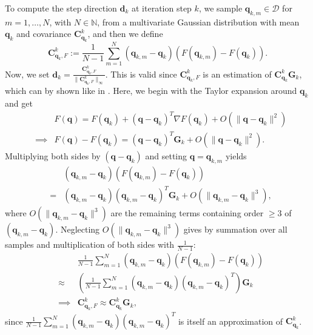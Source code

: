 To compute the step direction $\mathbf{d}_k$ at iteration step $k$, we sample $\mathbf{q}_{k,m}\in\mathcal{D}$ for $m=1,\dotsc,N$, with $N\in\mathbb{N}$, from a multivariate Gaussian distribution with mean $\mathbf{q}_k$ and covariance $\mathbf{C}_{\mathbf{q}_k}^k$, and then we define
\begin{equation}
\label{CqkF}
\mathbf{C}_{\mathbf{q}_k,F}^k:=\frac{1}{N-1}\sum_{m=1}^N(\mathbf{q}_{k,m}-\mathbf{q}_k)(F(\mathbf{q}_{k,m})-F(\mathbf{q}_k)).
\end{equation}
Now, we set $\mathbf{d}_k=\frac{\mathbf{C}_{\mathbf{q}_k,F}^k}{\|\mathbf{C}_{\mathbf{q}_k,F}^k\|_\infty}$. This is valid since $\mathbf{C}_{\mathbf{q}_k,F}^k$ is an estimation of $\mathbf{C}_{\mathbf{q}_k}^k\mathbf{G}_k$, which can by shown like in \cite{OGUNTOLA2021109165}. Here, we begin with the Taylor expansion around $\mathbf{q}_k$ and get
\begin{eqnarray*}
&&F(\mathbf{q})=F(\mathbf{q}_k)+(\mathbf{q}-\mathbf{q}_k)^T\nabla F(\mathbf{q}_k)+O(\|\mathbf{q}-\mathbf{q}_k\|^2)\\
&\implies&F(\mathbf{q})-F(\mathbf{q}_k)=(\mathbf{q}-\mathbf{q}_k)^T\mathbf{G}_k+O(\|\mathbf{q}-\mathbf{q}_k\|^2).
\end{eqnarray*}
Multiplying both sides by $(\mathbf{q}-\mathbf{q}_k)$ and setting $\mathbf{q}=\mathbf{q}_{k,m}$ yields
\begin{eqnarray*}
&&(\mathbf{q}_{k,m}-\mathbf{q}_k)(F(\mathbf{q}_{k,m})-F(\mathbf{q}_k))\\
&=&(\mathbf{q}_{k,m}-\mathbf{q}_k)(\mathbf{q}_{k,m}-\mathbf{q}_k)^T\mathbf{G}_k+O(\|\mathbf{q}_{k,m}-\mathbf{q}_k\|^3),
\end{eqnarray*}
where $O(\|\mathbf{q}_{k,m}-\mathbf{q}_k\|^3)$ are the remaining terms containing order $\geq3$ of $(\mathbf{q}_{k,m}-\mathbf{q}_k)$. Neglecting $O(\|\mathbf{q}_{k,m}-\mathbf{q}_k\|^3)$ gives by summation over all samples and multiplication of both sides with $\frac{1}{N-1}$:
\begin{eqnarray*}
&&\frac{1}{N-1}\sum_{m=1}^N(\mathbf{q}_{k,m}-\mathbf{q}_k)(F(\mathbf{q}_{k,m})-F(\mathbf{q}_k))\\
&\approx&\left(\frac{1}{N-1}\sum_{m=1}^N(\mathbf{q}_{k,m}-\mathbf{q}_k)(\mathbf{q}_{k,m}-\mathbf{q}_k)^T\right)\mathbf{G}_k\\
&\implies&\mathbf{C}_{\mathbf{q}_k,F}^k\approx\mathbf{C}_{\mathbf{q}_k}^k\mathbf{G}_k,
\end{eqnarray*}
since $\frac{1}{N-1}\sum_{m=1}^N(\mathbf{q}_{k,m}-\mathbf{q}_k)(\mathbf{q}_{k,m}-\mathbf{q}_k)^T$ is itself an approximation of $\mathbf{C}_{\mathbf{q}_k}^k$.\\

